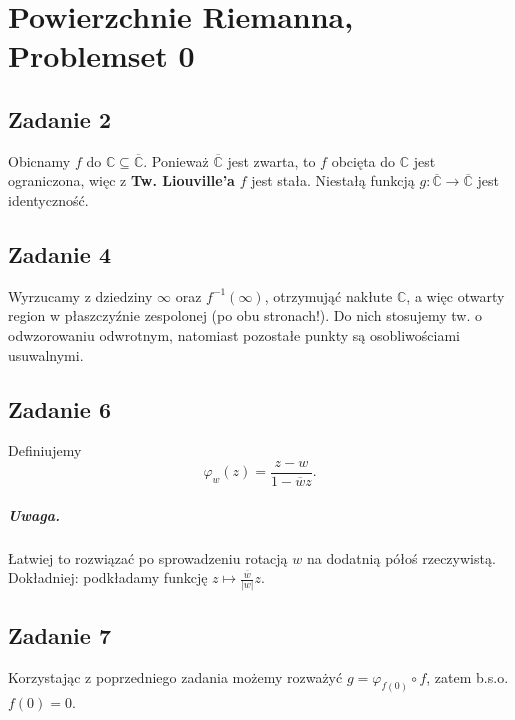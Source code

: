 \chapter{Powierzchnie Riemanna, Problemset 0}


\section*{Zadanie 2}

Obicnamy \( f \) do \( \mathbb{C} \subseteq \overline{ \mathbb{C} } \). Ponieważ \( \overline{ \mathbb{C} } \) jest zwarta, to \( f \) obcięta do \( \mathbb{C} \) jest ograniczona, więc z \textbf{Tw. Liouville'a} \( f \) jest stała. Niestałą funkcją \( g: \overline{ \mathbb{C} } \to \overline{ \mathbb{C} } \) jest identyczność.

\section*{Zadanie 4}

Wyrzucamy z dziedziny \( \infty \) oraz \( f^{-1}(\infty) \), otrzymująć nakłute \( \mathbb{C} \), a więc otwarty region w płaszczyźnie zespolonej (po obu stronach!). Do nich stosujemy tw. o odwzorowaniu odwrotnym, natomiast pozostałe punkty są osobliwościami usuwalnymi.

\section*{Zadanie 6}

Definiujemy
\[ 
    \varphi_w(z) = \frac{z - w}{1 - \overline{w}z}.
\]


\paragraph{Uwaga.} Łatwiej to rozwiązać po sprowadzeniu rotacją \( w \) na dodatnią półoś rzeczywistą. Dokładniej: podkładamy funkcję \( z \mapsto \frac{\overline{w}}{ \left| w \right|  }z \).

\section*{Zadanie 7}

Korzystając z poprzedniego zadania możemy rozważyć \( g = \varphi_{f(0)} \circ f \), zatem b.s.o. \( f(0) = 0 \).

